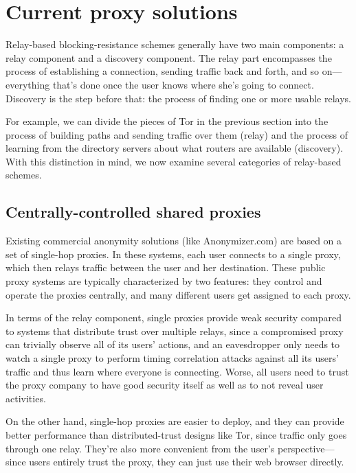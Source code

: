 \documentclass{llncs}
\begin{document}
\section{Current proxy solutions}
\label{sec:related}

Relay-based blocking-resistance schemes generally have two main
components: a relay component and a discovery component. The relay part
encompasses the process of establishing a connection, sending traffic
back and forth, and so on---everything that's done once the user knows
where she's going to connect. Discovery is the step before that: the
process of finding one or more usable relays.

For example, we can divide the pieces of Tor in the previous section
into the process of building paths and sending
traffic over them (relay) and the process of learning from the directory
servers about what routers are available (discovery).  With this distinction
in mind, we now examine several categories of relay-based schemes.

\subsection{Centrally-controlled shared proxies}

Existing commercial anonymity solutions (like Anonymizer.com) are based
on a set of single-hop proxies. In these systems, each user connects to
a single proxy, which then relays traffic between the user and her
destination. These public proxy
systems are typically characterized by two features: they control and
operate the proxies centrally, and many different users get assigned
to each proxy.

In terms of the relay component, single proxies provide weak security
compared to systems that distribute trust over multiple relays, since a
compromised proxy can trivially observe all of its users' actions, and
an eavesdropper only needs to watch a single proxy to perform timing
correlation attacks against all its users' traffic and thus learn where
everyone is connecting. Worse, all users
need to trust the proxy company to have good security itself as well as
to not reveal user activities.

On the other hand, single-hop proxies are easier to deploy, and they
can provide better performance than distributed-trust designs like Tor,
since traffic only goes through one relay. They're also more convenient
from the user's perspective---since users entirely trust the proxy,
they can just use their web browser directly.
\end{document}
